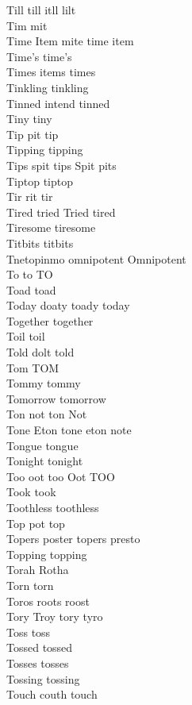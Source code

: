 Till till itll lilt\\
Tim mit\\
Time Item mite time item\\
Time's time's\\
Times items times\\
Tinkling tinkling\\
Tinned intend tinned\\
Tiny tiny\\
Tip pit tip\\
Tipping tipping\\
Tips spit tips Spit pits\\
Tiptop tiptop\\
Tir rit tir\\
Tired tried Tried tired\\
Tiresome tiresome\\
Titbits titbits\\
Tnetopinmo omnipotent Omnipotent\\
To to TO\\
Toad toad\\
Today doaty toady today\\
Together together\\
Toil toil\\
Told dolt told\\
Tom TOM\\
Tommy tommy\\
Tomorrow tomorrow\\
Ton not ton Not\\
Tone Eton tone eton note\\
Tongue tongue\\
Tonight tonight\\
Too oot too Oot TOO\\
Took took\\
Toothless toothless\\
Top pot top\\
Topers poster topers presto\\
Topping topping\\
Torah Rotha\\
Torn torn\\
Toros roots roost\\
Tory Troy tory tyro\\
Toss toss\\
Tossed tossed\\
Tosses tosses\\
Tossing tossing\\
Touch couth touch\\
